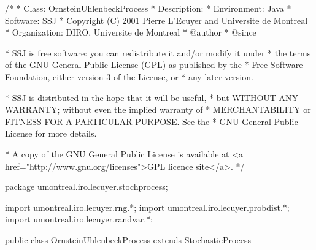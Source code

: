 \begin{code}
\begin{hide}
/*
 * Class:        OrnsteinUhlenbeckProcess
 * Description:  
 * Environment:  Java
 * Software:     SSJ 
 * Copyright (C) 2001  Pierre L'Ecuyer and Universite de Montreal
 * Organization: DIRO, Universite de Montreal
 * @author       
 * @since

 * SSJ is free software: you can redistribute it and/or modify it under
 * the terms of the GNU General Public License (GPL) as published by the
 * Free Software Foundation, either version 3 of the License, or
 * any later version.

 * SSJ is distributed in the hope that it will be useful,
 * but WITHOUT ANY WARRANTY; without even the implied warranty of
 * MERCHANTABILITY or FITNESS FOR A PARTICULAR PURPOSE.  See the
 * GNU General Public License for more details.

 * A copy of the GNU General Public License is available at
   <a href="http://www.gnu.org/licenses">GPL licence site</a>.
 */
\end{hide}
package umontreal.iro.lecuyer.stochprocess;\begin{hide}
import umontreal.iro.lecuyer.rng.*;
import umontreal.iro.lecuyer.probdist.*;
import umontreal.iro.lecuyer.randvar.*;

\end{hide}

public class OrnsteinUhlenbeckProcess extends StochasticProcess \begin{hide} {
    protected NormalGen    gen;
    protected double       alpha,
                           beta,
                           sigma;
    // Precomputed values 
    protected double[]     badt,
                           alphadt,
                           sigmasqrdt;
\end{hide}
\end{code}
